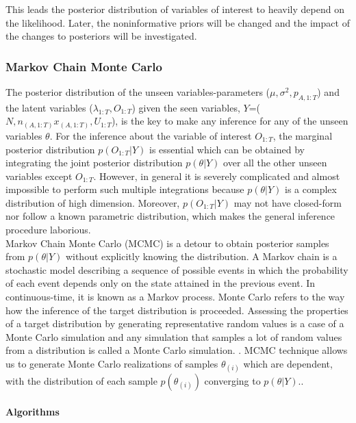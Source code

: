 \documentclass[12pt]{article}
\begin{document}
{This leads the posterior distribution of variables of interest to heavily depend on the likelihood. Later, the noninformative priors will be changed and the impact of the changes to posteriors will be investigated. 

\subsubsection{Markov Chain Monte Carlo}

The posterior distribution of the unseen variables-parameters ($\mu, \sigma^2, p_{A,1:T}$) and the latent variables ($\lambda_{1:T}, O_{1:T}$) given the seen variables, $Y$=($N, n_{(A,1:T)} x_{(A,1:T)}, U_{1:T}$), is the key to make any inference for any of the unseen variables $\theta$. For the inference about the variable of interest $O_{1:T}$, the marginal posterior distribution $p(O_{1:T}|Y)$ is essential which can be obtained by integrating the joint posterior distribution $p(\theta|Y)$ over all the other unseen variables except $O_{1:T}$. However, in general it is severely complicated and almost impossible to perform such multiple integrations because $p(\theta|Y)$ is a complex distribution of high dimension. Moreover, $p(O_{1:T}|Y)$ may not have closed-form nor follow a known parametric distribution, which makes the general inference procedure laborious.\\ 
 
Markov Chain Monte Carlo (MCMC) is a detour to obtain posterior samples from $p(\theta|Y)$ without explicitly knowing the distribution.  A Markov chain is a stochastic model describing a sequence of possible events in which the probability of each event depends only on the state attained in the previous event. In continuous-time, it is known as a Markov process. \cite{markov} Monte Carlo refers to the way how the inference of the target distribution is proceeded. Assessing the properties of a target distribution by generating representative random values is a case of a Monte Carlo simulation and any simulation that samples a lot of random values from a distribution is called a Monte Carlo simulation. \cite{gill}. MCMC technique allows us to generate Monte Carlo realizations of samples $\theta_{(i)}$ which are dependent, with the distribution of each sample $p(\theta_{(i)})$ converging to $p(\theta|Y)$.\cite{paul}.

\paragraph{Algorithms}

}
\end{document}
